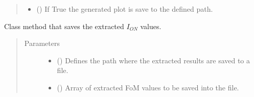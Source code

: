 \documentclass[letterpaper,10pt,english,openany, oneside]{sphinxmanual}
\begin{document}
\begin{fulllineitems}
\begin{fulllineitems}
\begin{quote}
\begin{description}
\begin{itemize}
\item {} 
 () \textendash{} If True the generated plot is save to the defined path.

\end{itemize}

\end{description}\end{quote}

\end{fulllineitems}


\begin{fulllineitems}
\label{\detokenize{index:fompy.fom.ion_ext.save_results_to_file}}
Class method that saves the extracted \(I_{ON}\) values.
\begin{quote}\begin{description}
\item[{Parameters}] \leavevmode\begin{itemize}
\item {} 
 () \textendash{} Defines the path where the extracted results are saved to a file.

\item {} 
 () \textendash{} Array of extracted FoM values to be saved into the file.

\end{itemize}

\end{description}\end{quote}

\end{fulllineitems}


\end{fulllineitems}

\end{document}
